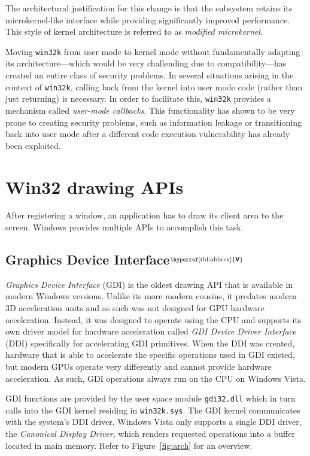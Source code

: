 \documentclass[10pt,twocolumn,a4paper]{article}
\newcommand{\bs}[1]{\textbf{\sffamily #1}}
\newcommand{\winver}[1]{$^{\text{\hyperref[tbl:abbrev]{\bs{#1}}}}$}
\newcommand{\winsubsection}[2]{\subsection[#1]{#1\winver{#2}}}
\begin{document}
			The architectural justification for this change is that the subsystem
			retains its microkernel-like interface while providing significantly
			improved performance. This style of kernel architecture is referred
			to as \emph{modified microkernel}. \cite{gdikernel}

			Moving \texttt{win32k} from user mode to kernel mode without fundamentally
			adapting its architecture---which would be very challending due to
			compatibility---has created an entire class of security problems.
			In several situations arising in the context of \texttt{win32k},
			calling back from the kernel into user mode code (rather than just
			returning) is necessary. In order to facilitate this, \texttt{win32k}
			provides a mechanism called \textit{user-mode callbacks}. This
			functionality has shown to be very prone to creating security problems,
			such as information leakage or transitioning back into user mode after
			a different code execution vulnerability has already been exploited.
			\cite{mandy2011kernel}

	\section{Win32 drawing APIs}
		After registering a window, an application has to draw its client area
		to the screen. Windows provides multiple APIs to accomplish this task.

		\winsubsection{Graphics Device Interface}{V} \label{sec:gdi}
			\textit{Graphics Device Interface} (GDI) is the oldest drawing API
			that is available in modern Windows versions. Unlike its more
			modern cousins, it predates modern 3D acceleration units and as such
			was not designed for GPU hardware acceleration. Instead, it was
			designed to operate using the CPU and supports its own driver model
			for hardware acceleration called \textit{GDI Device Driver
			Interface} (DDI) specifically for accelerating GDI
			primitives. When the DDI was created, hardware that is able to
			accelerate the specific operations used in GDI existed, but modern GPUs operate
			very differently and cannot provide hardware acceleration. As such,
			GDI operations always run on the CPU on Windows Vista. \cite{d2dvsgdi}

			GDI functions are provided by the user space module
			\texttt{gdi32.dll} which in turn calls into the GDI kernel residing
			in \texttt{win32k.sys}. The GDI kernel communicates with the
			system's DDI driver. Windows Vista only supports a single DDI driver,
			the \textit{Canonical Display Driver}, which renders requested operations
			into a buffer located in main memory. Refer to Figure~\ref{fig:arch}
			for an overview. \cite{d2dvsgdi, dwmredirect}
\end{document}
